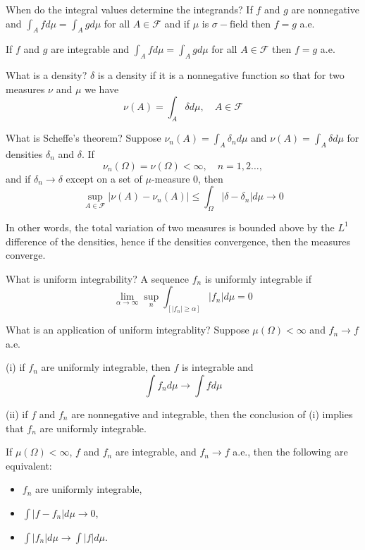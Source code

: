 \documentclass[avery5388,grid,frame]{flashcards}
\newcommand{\sigf}{\sigma-\text{field}}
\newcommand{\F}{\mathcal F}
\begin{document}
\begin{flashcard}
    {When do the integral values determine the integrands?}
    If $f$ and $g$ are nonnegative and $\int_A f d\mu = \int_A g d\mu$ for all $A \in \F$ and if $\mu$ is $\sigf$ then $f = g$ a.e.

    If $f$ and $g$ are integrable and $\int_A f d\mu = \int_A g d\mu$ for all $A \in \F$ then $f = g$ a.e.
\end{flashcard}


\begin{flashcard}
    {What is a density?}
    $\delta$ is a density if it is a nonnegative function so that for two measures $\nu$ and $\mu$ we have
    $$\nu(A) = \int_A \delta d\mu, \quad A \in \F$$
\end{flashcard}


\begin{flashcard}
    {What is Scheffe's theorem?}
    Suppose $\nu_n(A) = \int_A \delta_n d\mu$ and $\nu(A) = \int_A \delta d\mu$ for densities $\delta_n$ and $\delta$. If
    $$\nu_n(\Omega) = \nu(\Omega)< \infty, \quad n = 1,2\dots,$$
    and if $\delta_n \rightarrow \delta$ except on a set of $\mu$-measure 0, then
    $$\sup_{A \in \F} | \nu(A) - \nu_n(A) | \leq \int_\Omega |\delta - \delta_n| d\mu \rightarrow 0$$

    In other words, the total variation of two measures is bounded above by the $L^1$ difference of the densities, hence if the densities convergence, then the measures converge.
\end{flashcard}


\begin{flashcard}
    {What is uniform integrability?}
    A sequence $f_n$ is uniformly integrable if
    $$\lim_{\alpha \rightarrow \infty} \sup_n \int_{[|f_n| \geq \alpha]} |f_n| d\mu = 0$$
\end{flashcard}


\begin{flashcard}
    {What is an application of uniform integrablity?}
    Suppose $\mu(\Omega) < \infty$ and $f_n \rightarrow f$ a.e.

    (i) if $f_n$ are uniformly integrable, then $f$ is integrable and
    $$\int f_n d\mu \rightarrow \int f d\mu$$

    (ii) if $f$ and $f_n$ are nonnegative and integrable, then the conclusion of (i) implies that $f_n$ are uniformly integrable.

    If $\mu(\Omega) < \infty$, $f$ and $f_n$ are integrable, and $f_n \rightarrow f$ a.e., then the following are equivalent:
    \begin{itemize}
        \item $f_n$ are uniformly integrable,
        \item $\int | f - f_n | d\mu \rightarrow 0$,
        \item $\int |f_n| d\mu \rightarrow \int |f| d\mu$.
    \end{itemize}
\end{flashcard}
\end{document}
